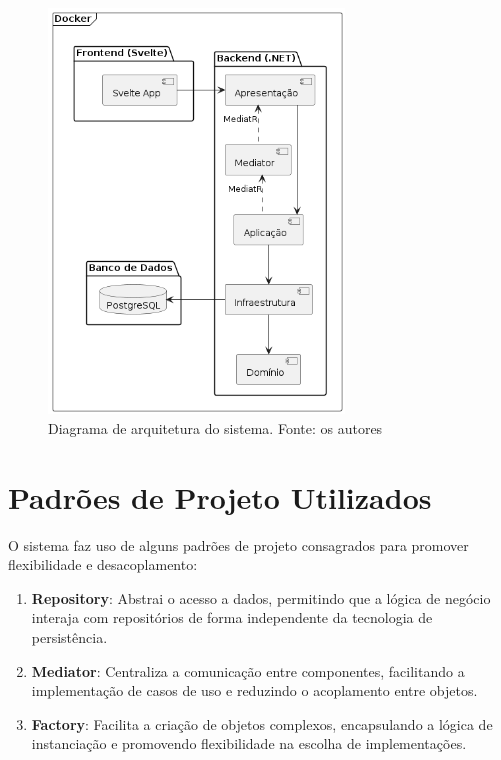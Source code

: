 \begin{figure}[H]
    \centering
    \includegraphics[width=0.7\textwidth]{diagrams/Architecture.png}
    \caption{Diagrama de arquitetura do sistema. Fonte: os autores}
    \label{fig:architecture}
\end{figure}

\section{Padrões de Projeto Utilizados}
O sistema faz uso de alguns padrões de projeto consagrados para promover flexibilidade e desacoplamento:

\begin{enumerate}
    \item \textbf{Repository}: Abstrai o acesso a dados, permitindo que a lógica de negócio interaja com repositórios de forma independente da tecnologia de persistência.
    \item \textbf{Mediator}: Centraliza a comunicação entre componentes, facilitando a implementação de casos de uso e reduzindo o acoplamento entre objetos.
    \item \textbf{Factory}: Facilita a criação de objetos complexos, encapsulando a lógica de instanciação e promovendo flexibilidade na escolha de implementações.
\end{enumerate}

